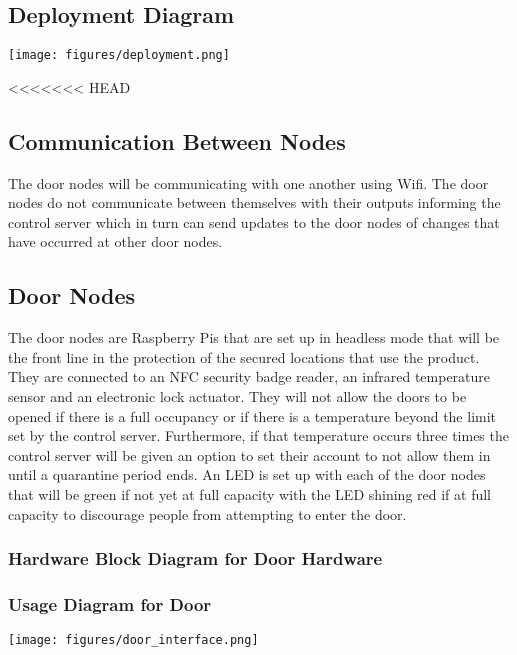 \subsection{Deployment Diagram}

\texttt{[image: figures/deployment.png]}

<<<<<<< HEAD
\subsection{Communication Between Nodes}
The door nodes will be communicating with one another using Wifi. The door nodes
do not communicate between themselves with their outputs informing the control
server which in turn can send updates to the door nodes of changes that have
occurred at other door nodes.

\subsection{Door Nodes}
The door nodes are Raspberry Pis that are set up in headless mode that will be
the front line in the protection of the secured locations that use the product.
They are connected to an NFC security badge reader, an infrared
temperature sensor and an electronic lock actuator. They will
not allow the doors to be opened if there is a full occupancy or if there is a
temperature beyond the limit set by the control server. Furthermore, if that
temperature occurs three times the control server will be given an option to set
their account to not allow them in until a quarantine period ends. An LED is set
up with each of the door nodes that will be green if not yet at full capacity
with the LED shining red if at full capacity to discourage people from
attempting to enter the door.


\subsubsection{Hardware Block Diagram for Door Hardware}

\subsubsection{Usage Diagram for Door}

\texttt{[image: figures/door\_interface.png]}

